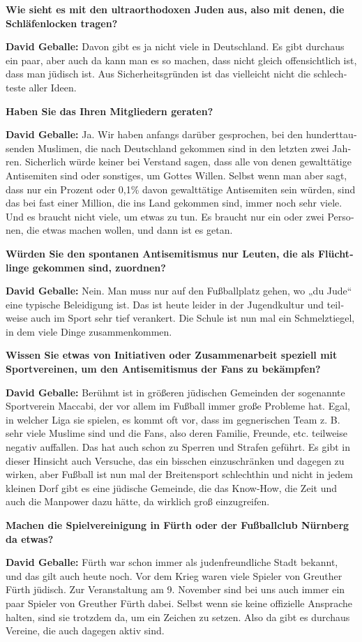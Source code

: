 \begin{otherlanguage}{ngerman}
\textbf{Wie sieht es mit den ultraorthodoxen Juden aus, also mit denen, die Schläfenlocken tragen?} 

\textbf{David Geballe:} Davon gibt es ja nicht viele in Deutschland. Es gibt durchaus ein paar, aber auch da kann man es so machen, dass nicht gleich offensichtlich ist, dass man jüdisch ist. Aus Sicherheitsgründen ist das vielleicht nicht die schlechteste aller Ideen. 

\textbf{Haben Sie das Ihren Mitgliedern geraten?} 

\textbf{David Geballe:} Ja. Wir haben anfangs darüber gesprochen, bei den hunderttausenden Muslimen, die nach Deutschland gekommen sind in den letzten zwei Jahren. Sicherlich würde keiner bei Verstand sagen, dass alle von denen gewalttätige Antisemiten sind oder sonstiges, um Gottes Willen. Selbst wenn man aber sagt, dass nur ein Prozent oder 0,1\% davon gewalttätige Antisemiten sein würden, sind das bei fast einer Million, die ins Land gekommen sind, immer noch sehr viele. Und es braucht nicht viele, um etwas zu tun. Es braucht nur ein oder zwei Personen, die etwas machen wollen, und dann ist es getan. 

\textbf{Würden Sie den spontanen Antisemitismus nur Leuten, die als Flüchtlinge gekommen sind, zuordnen?} 

\textbf{David Geballe:} Nein. Man muss nur auf den Fußballplatz gehen, wo „du Jude“ eine typische Beleidigung ist. Das ist heute leider in der Jugendkultur und teilweise auch im Sport sehr tief verankert. Die Schule ist nun mal ein Schmelztiegel, in dem viele Dinge zusammenkommen. 

\textbf{Wissen Sie etwas von Initiativen oder Zusammenarbeit speziell mit Sportvereinen, um den Antisemitismus der Fans zu bekämpfen?} 

\textbf{David Geballe:} Berühmt ist in größeren jüdischen Gemeinden der sogenannte Sportverein Maccabi, der vor allem im Fußball immer große Probleme hat. Egal, in welcher Liga sie spielen, es kommt oft vor, dass im gegnerischen Team z. B. sehr viele Muslime sind und die Fans, also deren Familie, Freunde, etc. teilweise negativ auffallen. Das hat auch schon zu Sperren und Strafen geführt. Es gibt in dieser Hinsicht auch Versuche, das ein bisschen einzuschränken und dagegen zu wirken, aber Fußball ist nun mal der Breitensport schlechthin und nicht in jedem kleinen Dorf gibt es eine jüdische Gemeinde, die das Know-How, die Zeit und auch die Manpower dazu hätte, da wirklich groß einzugreifen. 

\textbf{Machen die Spielvereinigung in Fürth oder der Fußballclub Nürnberg da etwas?} 

\textbf{David Geballe:} Fürth war schon immer als judenfreundliche Stadt bekannt, und das gilt auch heute noch. Vor dem Krieg waren viele Spieler von Greuther Fürth jüdisch. Zur Veranstaltung am 9. November sind bei uns auch immer ein paar Spieler von Greuther Fürth dabei. Selbst wenn sie keine offizielle Ansprache halten, sind sie trotzdem da, um ein Zeichen zu setzen. Also da gibt es durchaus Vereine, die auch dagegen aktiv sind. 
\end{otherlanguage}
